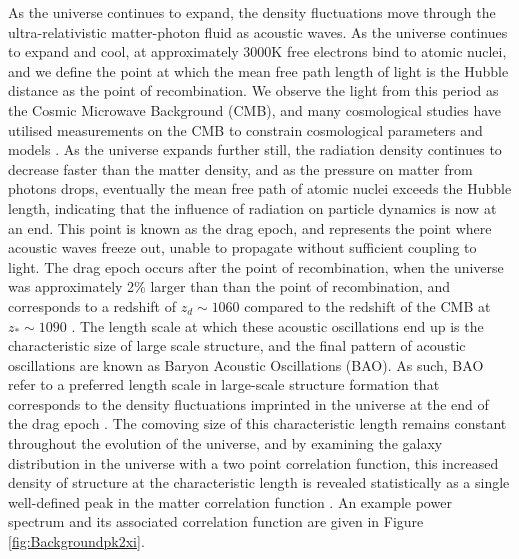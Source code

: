 \documentclass[titlesmallcaps, examinerscopy, copyrightpage]{uqthesis}
\begin{document}
As the universe continues to expand, the density fluctuations move through the ultra-relativistic matter-photon fluid as acoustic waves. As the universe continues to expand and cool, at approximately 3000K free electrons bind to atomic nuclei, and we define the point at which the mean free path length of light is the Hubble distance as the point of recombination. We observe the light from this period as the Cosmic Microwave Background (CMB), and many cosmological studies have utilised measurements on the CMB to constrain cosmological parameters and models \citep{BoggessMather1992,BennettLarson2013,Planck20151}. As the universe expands further still, the radiation density continues to decrease faster than the matter density, and as the pressure on matter from photons drops, eventually the mean free path of atomic nuclei exceeds the Hubble length, indicating that the influence of radiation on particle dynamics is now at an end. This point is known as the drag epoch, and represents the point where acoustic waves freeze out, unable to propagate without sufficient coupling to light. The drag epoch occurs after the point of recombination, when the universe was approximately 2\% larger than than the point of recombination, and corresponds to a redshift of $z_d \sim 1060$ compared to the redshift of the CMB at $z_* \sim 1090$ \cite{Planck2015Parameters}. The length scale at which these acoustic oscillations end up is the characteristic size of large scale structure, and the final pattern of acoustic oscillations are known as Baryon Acoustic Oscillations (BAO). As such, BAO refer to a preferred length scale in large-scale structure formation that corresponds to the density fluctuations imprinted in the universe at the end of the drag epoch \citep{BondEfstathiou1984, Holtzman1989, HuSugiyama1996, EisensteinHu1998, MeiksinWhitePeacock1999}. The comoving size of this characteristic length remains constant throughout the evolution of the universe, and by examining the galaxy distribution in the universe with a two point correlation function, this increased density of structure at the characteristic length is revealed statistically as a single well-defined peak in the matter correlation function \citep{Matsubara2004}. An example power spectrum and its associated correlation function are given in Figure \ref{fig:Backgroundpk2xi}.
\end{document}
